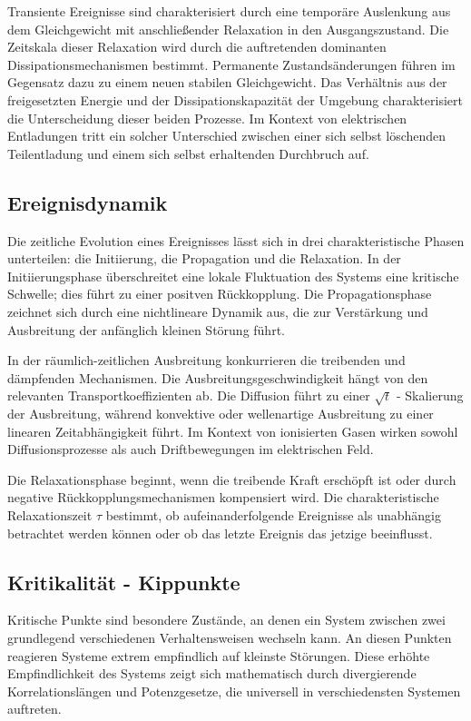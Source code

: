 Transiente Ereignisse sind charakterisiert durch eine temporäre Auslenkung aus dem Gleichgewicht mit anschließender Relaxation in den Ausgangszustand. Die Zeitskala dieser Relaxation wird durch die auftretenden dominanten Dissipationsmechanismen bestimmt. Permanente Zustandsänderungen führen im Gegensatz dazu zu einem neuen stabilen Gleichgewicht. Das Verhältnis aus der freigesetzten Energie und der Dissipationskapazität der Umgebung charakterisiert die Unterscheidung dieser beiden Prozesse. Im Kontext von elektrischen Entladungen tritt ein solcher Unterschied zwischen einer sich selbst löschenden Teilentladung und einem sich selbst erhaltenden Durchbruch auf.

\subsection{Ereignisdynamik}
Die zeitliche Evolution eines Ereignisses lässt sich in drei charakteristische Phasen unterteilen: die Initiierung, die Propagation und die Relaxation. In der Initiierungsphase überschreitet eine lokale Fluktuation des Systems eine kritische Schwelle; dies führt zu einer positven Rückkopplung. Die Propagationsphase zeichnet sich durch eine nichtlineare Dynamik aus, die zur Verstärkung und Ausbreitung der anfänglich kleinen Störung führt.

In der räumlich-zeitlichen Ausbreitung konkurrieren die treibenden und dämpfenden Mechanismen. Die Ausbreitungsgeschwindigkeit hängt von den relevanten Transportkoeffizienten ab. Die Diffusion führt zu einer \(\sqrt{t}\) - Skalierung der Ausbreitung, während konvektive oder wellenartige Ausbreitung zu einer linearen Zeitabhängigkeit führt. Im Kontext von ionisierten Gasen wirken sowohl Diffusionsprozesse als auch Driftbewegungen im elektrischen Feld. \cite{Crank}

Die Relaxationsphase beginnt, wenn die treibende Kraft erschöpft ist oder durch negative Rückkopplungsmechanismen kompensiert wird. Die charakteristische Relaxationszeit \(\tau\) bestimmt, ob aufeinanderfolgende Ereignisse als unabhängig betrachtet werden können oder ob das letzte Ereignis das jetzige beeinflusst.

\subsection{Kritikalität - Kippunkte}
\label{sec:critpoint}
Kritische Punkte sind besondere Zustände, an denen ein System zwischen zwei grundlegend verschiedenen Verhaltensweisen wechseln kann. An diesen Punkten reagieren Systeme extrem empfindlich auf kleinste Störungen. Diese erhöhte Empfindlichkeit des Systems zeigt sich mathematisch durch divergierende Korrelationslängen und Potenzgesetze, die universell in verschiedensten Systemen auftreten.

